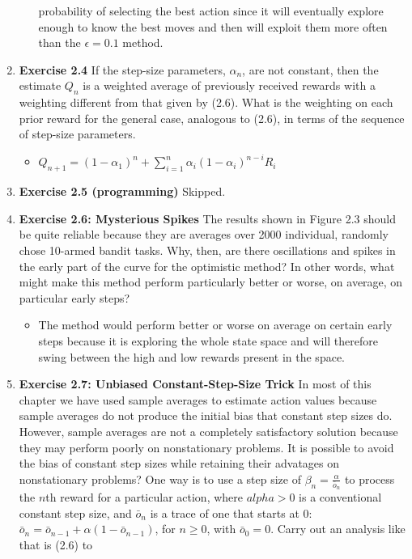 \documentclass[12pt]{article}
\begin{document}
\begin{enumerate}[label=(\alph*)]
\begin{itemize}
    probability of selecting the best action since it will eventually explore enough to know the best moves and then will
    exploit them more often than the $\epsilon = 0.1$ method. 
  \end{itemize}
  \item \textbf{Exercise 2.4} If the step-size parameters, $\alpha_n$, are not constant, then the estimate $Q_n$ is a
  weighted average of previously received rewards with a weighting different from that given by (2.6). What is the
  weighting on each prior reward for the general case, analogous to (2.6), in terms of the sequence of step-size parameters.
  \begin{itemize}
    \item $Q_{n+1} = (1 - \alpha_1)^n + \sum_{i = 1}^{n}\alpha_i(1 - \alpha_i)^{n - i}R_i$
  \end{itemize}
  \item \textbf{Exercise 2.5 (programming)} Skipped.
  \item \textbf{Exercise 2.6: Mysterious Spikes} The results shown in Figure 2.3 should be quite reliable because they are
  averages over 2000 individual, randomly chose 10-armed bandit tasks. Why, then, are there oscillations and spikes in the early
  part of the curve for the optimistic method? In other words, what might make this method perform particularly better or worse,
  on average, on particular early steps?
  \begin{itemize}
    \item The method would perform better or worse on average on certain early steps because it is exploring the whole state space
    and will therefore swing between the high and low rewards present in the space.
  \end{itemize}
  \item \textbf{Exercise 2.7: Unbiased Constant-Step-Size Trick} In most of this chapter we have used sample averages to estimate action
  values because sample averages do not produce the initial bias that constant step sizes do. However, sample averages are not a completely
  satisfactory solution because they may perform poorly on nonstationary problems. It is possible to avoid the bias of constant step sizes
  while retaining their advatages on nonstationary problems? One way is to use a step size of $\beta_n = \frac{\alpha}{\bar{o}_n}$ to process 
  the $n$th reward for a particular action, where $alpha > 0$ is a conventional constant step size, and $\bar{o}_n$ is a trace of one that starts
  at 0: $\bar{o}_n = \bar{o}_{n-1} + \alpha(1 - \bar{o}_{n-1})$, for $n \ge 0$, with $\bar{o}_0 = 0$. Carry out an analysis like that is (2.6) to

\end{enumerate}
\end{document}
